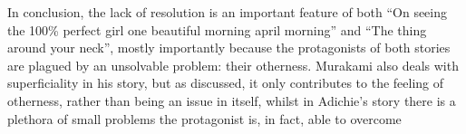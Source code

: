 \documentclass{article}
\begin{document}
In conclusion, the lack of resolution is an important feature of both ``On seeing the 100\% perfect girl one beautiful morning april morning'' and ``The thing around your neck'', mostly importantly because the protagonists of both stories are plagued by an unsolvable problem: their otherness. Murakami also deals with superficiality in his story, but as discussed, it only contributes to the feeling of otherness, rather than being an issue in itself, whilst in Adichie's story there is a plethora of small problems the protagonist is, in fact, able to overcome 
\end{document}
